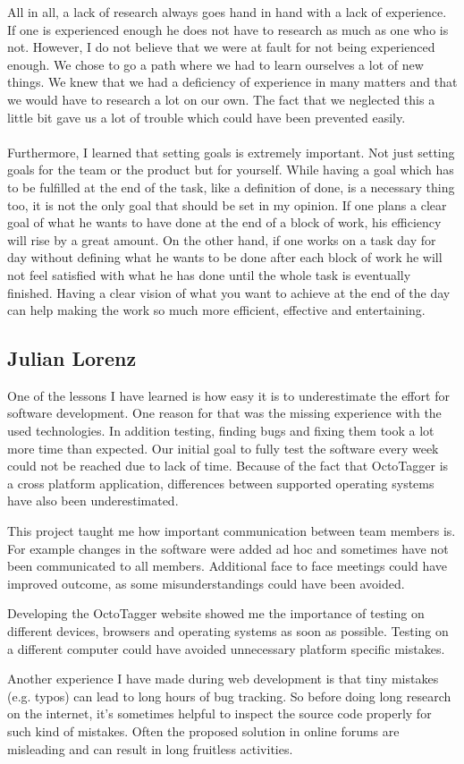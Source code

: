 All in all, a lack of research always goes hand in hand with a lack of
experience. If one is experienced enough he does not have to research as much as
one who is not. However, I do not believe that we were at fault for not being
experienced enough. We chose to go a path where we had to learn ourselves a lot
of new things. We knew that we had a deficiency of experience in many matters
and that we would have to research a lot on our own. The fact that we neglected
this a little bit gave us a lot of trouble which could have been prevented
easily.

\paragraph{}
Furthermore, I learned that setting goals is extremely important. Not just
setting goals for the team or the product but for yourself. While having a goal
which has to be fulfilled at the end of the task, like a definition of done, is
a necessary thing too, it is not the only goal that should be set in my opinion.
If one plans a clear goal of what he wants to have done at the end of a block of
work, his efficiency will rise by a great amount. On the other hand, if one
works on a task day for day without defining what he wants to be done after each
block of work he will not feel satisfied with what he has done until the whole
task is eventually finished. Having a clear vision of what you want to achieve
at the end of the day can help making the work so much more efficient, effective
and entertaining.

\subsection{Julian Lorenz}

One of the lessons I have learned is how easy it is to underestimate the effort
for software development. One reason for that was the missing experience with
the used technologies. In addition testing, finding bugs and fixing them took a
lot more time than expected. Our initial goal to fully test the software every
week could not be reached due to lack of time. Because of the fact that
OctoTagger is a cross platform application, differences between supported
operating systems have also been underestimated.

This project taught me how important communication between team members is. For
example changes in the software were added ad hoc and sometimes have not been
communicated to all members. Additional face to face meetings could have
improved outcome, as some misunderstandings could have been avoided.

Developing the OctoTagger website showed me the importance of testing on
different devices, browsers and operating systems as soon as possible. Testing
on a different computer could have avoided unnecessary platform specific
mistakes.

Another experience I have made during web development is that tiny mistakes
(e.g. typos) can lead to long hours of bug tracking. So before doing long
research on the internet, it's sometimes helpful to inspect the source code
properly for such kind of mistakes. Often the proposed solution in online forums
are misleading and can result in long fruitless activities.
